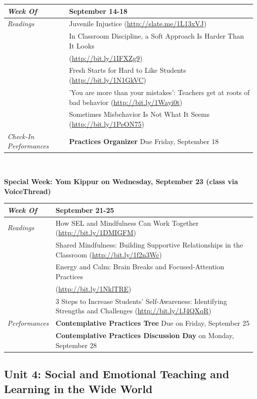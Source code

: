 \documentclass[two-side]{tufte-handout}
\newcommand{\tabread}{\faBook\medspace\textit{Readings}}
\newcommand{\tabperformance}{\faTasks\medspace\textit{Performances}}
\newcommand{\tabdt}{\faCalendar\medspace\textit{Week Of}}
\newcommand{\tabcheckin}{\faCheckSquareO\medspace\textit{Check-In Performances}}
\newcommand{\tabbreak}{\begin{fullwidth}\begin{center}\faAsterisk\faAsterisk\faAsterisk\\\end{center}\end{fullwidth}}
\newcommand{\specialweek}[1]{\begin{fullwidth}\begin{center}\textbf{\faBullhorn\medspace Special Week: #1 \medspace\faBullhorn}\end{center}\end{fullwidth}}
\newenvironment{tabsched}
	{\small
	\begin{tabular}{p{1.5in}p{4.5in}}
	\midrule}
	{\midrule
	\end{tabular}
	\normalsize}
\newcommand{\weekfive}{September 14-18}
\newcommand{\weeksix}{September 21-25}
\newcommand{\yomkippur}{Yom Kippur on Wednesday, September 23 (class via VoiceThread)}
\begin{document}
\begin{tabsched}
	\tabdt & \weekfive \\
	\midrule
	\tabread & Juvenile Injustice (\url{http://slate.me/1L13xVJ}) \\
	& In Classroom Discipline, a Soft Approach Is Harder Than It Looks \\
	& (\url{http://bit.ly/1IFXZg9}) \\
	& Fresh Starts for Hard to Like Students (\url{http://bit.ly/1N1GkVC}) \\
	& 'You are more than your mistakes': Teachers get at roots of bad behavior (\url{http://bit.ly/1Wayi0t}) \\
	& Sometimes Misbehavior Is Not What It Seems (\url{http://bit.ly/1PeON75}) \\
	\midrule
	\tabcheckin & \textbf{Practices Organizer} Due Friday, September 18 \\
\end{tabsched}

\tabbreak

\newpage

\specialweek{\yomkippur}

\begin{tabsched}
	\tabdt & \weeksix \\
	\midrule
	\tabread & How SEL and Mindfulness Can Work Together (\url{http://bit.ly/1DMIGFM}) \\
	& Shared Mindfulness: Building Supportive Relationships in the Classroom (\url{http://bit.ly/1f2n3Wc}) \\
	& Energy and Calm: Brain Breaks and Focused-Attention Practices \\
	& (\url{http://bit.ly/1NklTRE}) \\
	& 3 Steps to Increase Students' Self-Awareness: Identifying Strengths and Challenges (\url{http://bit.ly/1J4QXqR}) \\
	\midrule
	\tabperformance & \textbf{Contemplative Practices Tree} Due on Friday, September 25 \\
	& \textbf{Contemplative Practices Discussion Day} on Monday, September 28 \\
\end{tabsched}

\begin{fullwidth}
	\section{Unit 4: Social and Emotional Teaching and Learning in the Wide World}
\end{fullwidth}
\end{document}
